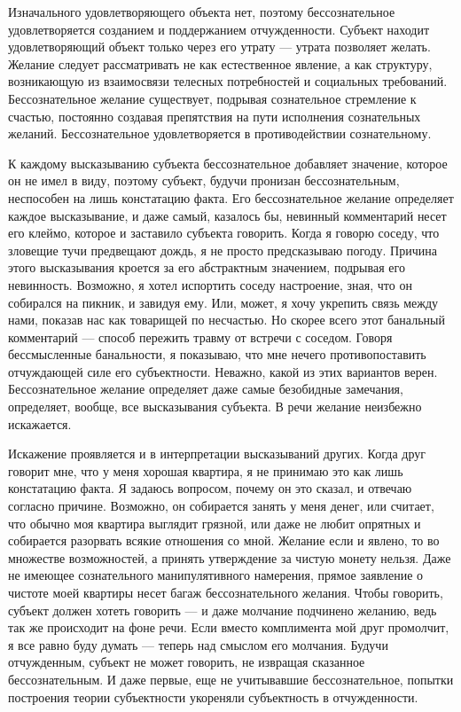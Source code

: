 \documentclass[12pt]{book}
\begin{document}
Изначального удовлетворяющего объекта нет, поэтому бессознательное удовлетворяется созданием и поддержанием отчужденности. Субъект находит удовлетворяющий объект только через его утрату --- утрата позволяет желать. Желание следует рассматривать не как естественное явление, а как структуру, возникающую из взаимосвязи телесных потребностей и социальных требований. Бессознательное желание существует, подрывая сознательное стремление к счастью, постоянно создавая препятствия на пути исполнения сознательных желаний. Бессознательное удовлетворяется в противодействии сознательному.

К каждому высказыванию субъекта бессознательное добавляет значение, которое он не имел в виду, поэтому субъект, будучи пронизан бессознательным, неспособен на лишь констатацию факта. Его бессознательное желание определяет каждое высказывание, и даже самый, казалось бы, невинный комментарий несет его клеймо, которое и заставило субъекта говорить. Когда я говорю соседу, что зловещие тучи предвещают дождь, я не просто предсказываю погоду. Причина этого высказывания кроется за его абстрактным значением, подрывая его невинность. Возможно, я хотел испортить соседу настроение, зная, что он собирался на пикник, и завидуя ему. Или, может, я хочу укрепить связь между нами, показав нас как товарищей по несчастью. Но скорее всего этот банальный комментарий --- способ пережить травму от встречи с соседом. Говоря бессмысленные банальности, я показываю, что мне нечего противопоставить отчуждающей силе его субъектности. Неважно, какой из этих вариантов верен. Бессознательное желание определяет даже самые безобидные замечания, определяет, вообще, все высказывания субъекта. В речи желание неизбежно искажается.

Искажение проявляется и в интерпретации высказываний других. Когда друг говорит мне, что у меня хорошая квартира, я не принимаю это как лишь констатацию факта. Я задаюсь вопросом, почему он это сказал, и отвечаю согласно причине. Возможно, он собирается занять у меня денег, или считает, что обычно моя квартира выглядит грязной, или даже не любит опрятных и собирается разорвать всякие отношения со мной. Желание если и явлено, то во множестве возможностей, а принять утверждение за чистую монету нельзя. Даже не имеющее сознательного манипулятивного намерения, прямое заявление о чистоте моей квартиры несет багаж бессознательного желания. Чтобы говорить, субъект должен хотеть говорить --- и даже молчание подчинено желанию, ведь так же происходит на фоне речи. Если вместо комплимента мой друг промолчит, я все равно буду думать --- теперь над смыслом его молчания. Будучи отчужденным, субъект не может говорить, не извращая сказанное бессознательным. И даже первые, еще не учитывавшие бессознательное, попытки построения теории субъектности укореняли субъектность в отчужденности.
\end{document}

